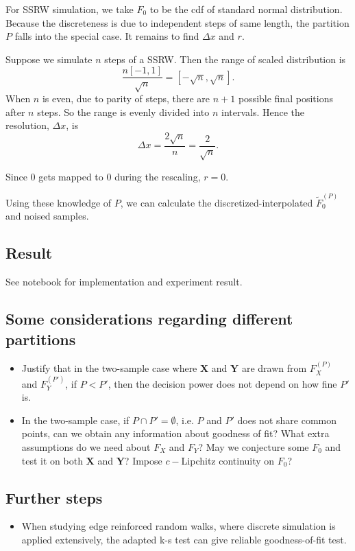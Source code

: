 For SSRW simulation, we take $F_0$ to be the cdf of standard normal distribution. Because the discreteness is due to independent steps of same length, the partition $P$ falls into the special case. It remains to find $\Delta x$ and $r$.

Suppose we simulate $n$ steps of a SSRW. Then the range of scaled distribution is
\[
	\frac{n[-1, 1]}{\sqrt{n} } = [-\sqrt{n}, \sqrt{n} ] 
.\]
When $n$ is even, due to parity of steps, there are $n+1$ possible final positions after $n$ steps. So the range is evenly divided into $n$ intervals. Hence the resolution, $\Delta x$, is
\[
	\Delta x = \frac{2 \sqrt{n} }{n} = \frac{2}{\sqrt{n} }
.\] 

Since $0$ gets mapped to $0$ during the rescaling, $r = 0$.

Using these knowledge of $P$, we can calculate the discretized-interpolated $\tilde F_0 ^{(P)}$ and noised samples. 

\subsection*{Result}

See notebook for implementation and experiment result.



\subsection*{Some considerations regarding different partitions}
\begin{itemize}
	\item Justify that in the two-sample case where $\mathbf{X}$ and $\mathbf{Y}$ are drawn from $F_X^{(P)}$ and $F_Y^{(P')}$, if $P < P'$, then the decision power does not depend on how fine $P'$ is.
	\item In the two-sample case, if $P \cap P' = \emptyset $, i.e. $P$ and $P'$ does not share common points, can we obtain any information about goodness of fit? What extra assumptions do we need about $ F_X$ and $F_Y$? May we conjecture some $F_0$ and test it on both $\mathbf{X}$ and $\mathbf{Y}$? Impose $c-$Lipchitz continuity on $F_0$?
\end{itemize}

\subsection*{Further steps}
\begin{itemize}
	\item When studying edge reinforced random walks, where discrete simulation is applied extensively, the adapted k-s test can give reliable goodness-of-fit test.
\end{itemize}
